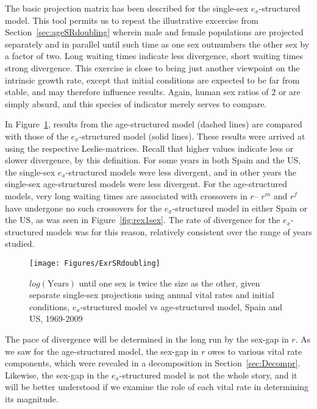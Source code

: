  \FloatBarrier
 \label{sex:doublingex}
The basic projection matrix has been described for the single-sex
$e_x$-structured model. This tool permits us to repeat the illustrative
excercise from Section~\ref{sec:ageSRdoubling} wherein male and female populations are
projected separately and in parallel until such time as one sex outnumbers the
other sex by a factor of two. Long waiting times indicate less divergence, short
waiting times strong divergence. This exercise is close to being just another
viewpoint on the intrinsic growth rate, except that initial conditions are
expected to be far from stable, and may therefore influence results. Again,
human sex ratios of 2 or \textonehalf are simply absurd, and this species of
indicator merely serves to compare.

In Figure~\ref{fig:exSRdoubling}, results from the age-structured model (dashed
lines) are compared with those of the $e_x$-structured model (solid lines).
These results were arrived at using the respective Leslie-matrices. Recall that
higher values indicate less or slower divergence, by this definition. For some 
years in both Spain and the US, the single-sex $e_x$-structured models were less 
divergent, and in other years the single-sex age-structured models were less divergent.
 For the age-structured models, very long waiting times are associated
with crossovers in $r$-- $r^m$ and $r^f$ have undergone no such crossovers for
the $e_x$-structured model in either Spain or the US, as was seen in
Figure~\ref{fig:rex1sex}. The rate of divergence for the $e_x$-structured models
was for this reason, relatively consistent over the range of years studied. 

\begin{figure}[ht!]
        \centering  
          \caption{$log(\mathrm{Years})$ until one sex is twice the size as the
          other, given separate single-sex projections using annual vital rates and initial
          conditions, $e_x$-structured model vs age-structured model, Spain
          and US, 1969-2009}
           \texttt{[image: Figures/ExrSRdoubling]}
          \label{fig:exSRdoubling}
\end{figure}

The pace of divergence will be determined in the long run by the sex-gap in $r$.
As we saw for the age-structured model, the sex-gap in $r$ owes to various vital
rate components, which were revealed in a decomposition in
Section~\ref{sec:Decompr}. Likewise, the sex-gap in the $e_x$-structured model
is not the whole story, and it will be better understood if we examine the role
of each vital rate in determining its magnitude.

 \FloatBarrier
